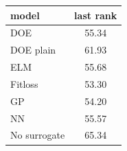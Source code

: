 \begin{tabular}{|lc|}
\hline
model & last rank\\
\hline
DOE & 55.34 \\
DOE plain & 61.93 \\
ELM & 55.68 \\
Fitloss & 53.30 \\
GP & 54.20 \\
NN & 55.57 \\
No surrogate & 65.34 \\
\hline
\end{tabular}

